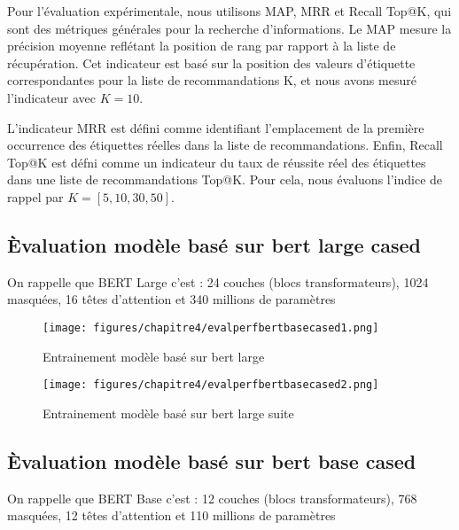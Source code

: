 Pour l'évaluation expérimentale, nous utilisons MAP, MRR et Recall Top@K, qui sont des métriques générales pour la recherche d'informations. Le MAP mesure la précision moyenne reflétant la position de rang par rapport à la liste de récupération. Cet indicateur est basé sur la position des valeurs d'étiquette correspondantes pour la liste de recommandations K, et nous avons mesuré l'indicateur avec $K = 10$.

L'indicateur MRR est défini comme identifiant l'emplacement de la première occurrence des étiquettes réelles dans la liste de recommandations. Enfin, Recall Top@K est défni comme un indicateur du taux de réussite réel des étiquettes dans une liste de recommandations Top@K. Pour cela, nous évaluons l'indice de rappel par $K = [ 5, 10, 30, 50 ]$. 

    \subsection{Èvaluation modèle basé sur bert large cased}
    \par On rappelle que BERT Large c'est : 24 couches (blocs transformateurs), 1024 masquées, 16 têtes d’attention et 340 millions de paramètres
    
    \begin{figure}[H]
    	\begin{center}
    		\texttt{[image: figures/chapitre4/evalperfbertbasecased1.png]}
    	\end{center}
    	\caption {Entrainement modèle basé sur bert large }
    	\label{fig:large1}
    \end{figure}  
    
    \begin{figure}[H]
    	\begin{center}
    		\texttt{[image: figures/chapitre4/evalperfbertbasecased2.png]}
    	\end{center}
    	\caption {Entrainement modèle basé sur bert large suite}
    	\label{fig:large2}
    \end{figure}  


    \subsection{Èvaluation modèle basé sur bert base cased}
    \par On rappelle que BERT Base c'est : 12 couches (blocs transformateurs), 768 masquées, 12 têtes d’attention et 110 millions de paramètres
    
